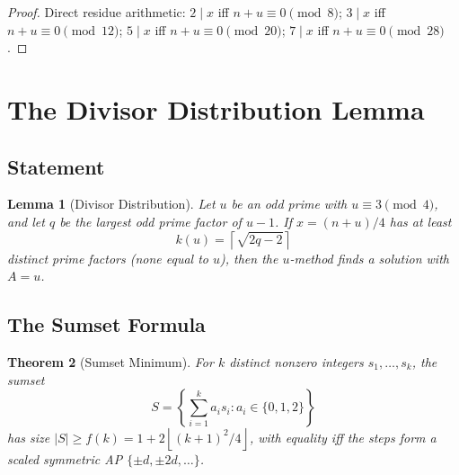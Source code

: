 \documentclass[11pt,a4paper]{article}
\theoremstyle{plain}
\newtheorem{theorem}{Theorem}[section]
\newtheorem{lemma}[theorem]{Lemma}
\theoremstyle{definition}
\newcommand{\floor}[1]{\left\lfloor #1 \right\rfloor}
\begin{document}
\begin{proof}
Direct residue arithmetic: $2 \mid x$ iff $n + u \equiv 0 \pmod{8}$; $3 \mid x$ iff $n + u \equiv 0 \pmod{12}$; $5 \mid x$ iff $n + u \equiv 0 \pmod{20}$; $7 \mid x$ iff $n + u \equiv 0 \pmod{28}$.
\end{proof}

\section{The Divisor Distribution Lemma}

\subsection{Statement}

\begin{lemma}[Divisor Distribution]
\label{lem:divdist}
Let $u$ be an odd prime with $u \equiv 3 \pmod{4}$, and let $q$ be the largest odd prime factor of $u - 1$. If $x = (n+u)/4$ has at least
\[
k(u) = \left\lceil \sqrt{2q - 2} \right\rceil
\]
distinct prime factors (none equal to $u$), then the $u$-method finds a solution with $A = u$.
\end{lemma}

\subsection{The Sumset Formula}

\begin{theorem}[Sumset Minimum]
\label{thm:sumset}
For $k$ distinct nonzero integers $s_1, \ldots, s_k$, the sumset
\[
S = \left\{\sum_{i=1}^k a_i s_i : a_i \in \{0, 1, 2\}\right\}
\]
has size $|S| \geq f(k) = 1 + 2\floor{(k+1)^2/4}$, with equality iff the steps form a scaled symmetric AP $\{\pm d, \pm 2d, \ldots\}$.
\end{theorem}
\end{document}
